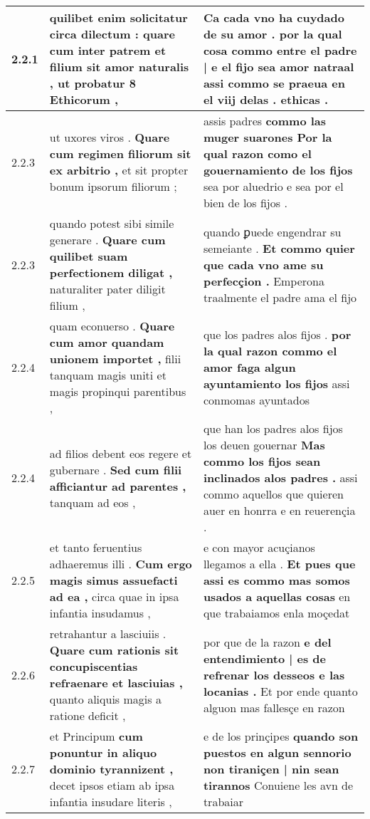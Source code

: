\begin{tabular}{|p{1cm}|p{6.5cm}|p{6.5cm}|}
2.2.1 & quilibet enim solicitatur circa dilectum : \textbf{ quare cum inter patrem et filium sit amor naturalis , } ut probatur 8 Ethicorum , & Ca cada vno ha cuydado de su amor . \textbf{ por la qual cosa commo entre el padre | e el fijo sea amor natraal } assi commo se praeua en el viij delas . ethicas . \\\hline
2.2.3 & ut uxores viros . \textbf{ Quare cum regimen filiorum sit ex arbitrio , } et sit propter bonum ipsorum filiorum ; & assis padres \textbf{ commo las muger suarones Por la qual razon como el gouernamiento de los fijos } sea por aluedrio e sea por el bien de los fijos . \\\hline
2.2.3 & quando potest sibi simile generare . \textbf{ Quare cum quilibet suam perfectionem diligat , } naturaliter pater diligit filium , & quando ꝑuede engendrar su semeiante . \textbf{ Et commo quier que cada vno ame su perfecçion . } Emperona traalmente el padre ama el fijo \\\hline
2.2.4 & quam econuerso . \textbf{ Quare cum amor quandam unionem importet , } filii tanquam magis uniti et magis propinqui parentibus , & que los padres alos fijos . \textbf{ por la qual razon commo el amor faga algun ayuntamiento los fijos } assi conmomas ayuntados \\\hline
2.2.4 & ad filios debent eos regere et gubernare . \textbf{ Sed cum filii afficiantur ad parentes , } tanquam ad eos , & que han los padres alos fijos los deuen gouernar \textbf{ Mas commo los fijos sean inclinados alos padres . } assi commo aquellos que quieren auer en honrra e en reuerençia . \\\hline
2.2.5 & et tanto feruentius adhaeremus illi . \textbf{ Cum ergo magis simus assuefacti ad ea , } circa quae in ipsa infantia insudamus , & e con mayor acuçianos llegamos a ella . \textbf{ Et pues que assi es commo mas somos usados a aquellas cosas } en que trabaiamos enla moçedat \\\hline
2.2.6 & retrahantur a lasciuiis . \textbf{ Quare cum rationis sit concupiscentias refraenare et lasciuias , } quanto aliquis magis a ratione deficit , & por que de la razon \textbf{ e del entendimiento | es de refrenar los desseos e las locanias . } Et por ende quanto alguon mas fallesçe en razon \\\hline
2.2.7 & et Principum \textbf{ cum ponuntur in aliquo dominio tyrannizent , } decet ipsos etiam ab ipsa infantia insudare literis , & e de los prinçipes \textbf{ quando son puestos en algun sennorio non tiraniçen | nin sean tirannos } Conuiene les avn de trabaiar \\\hline

\end{tabular}
